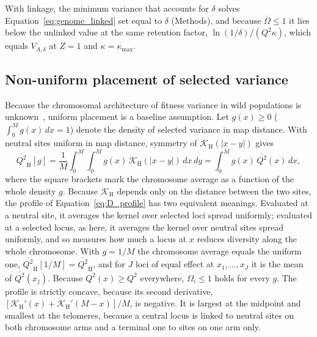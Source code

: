 \documentclass{article}
\begin{document}
With linkage, the minimum variance that accounts for $\delta$ solves Equation~\eqref{eq:genome_linked} set equal to $\delta$ (Methods), and because $\overline{\Omega} \le 1$ it lies below the unlinked value at the same retention factor, $\ln(1/\delta)/(Q^2\kappa)$, which equals $V_{A,\delta}$ at $Z = 1$ and $\kappa = \kappa_\text{max}$.

\subsection{Non-uniform placement of selected variance}\label{app:D_spatial}
Because the chromosomal architecture of fitness variance in wild populations is unknown~\cite{barton2002}, uniform placement is a baseline assumption. Let $g(x) \ge 0$ ($\int_0^M g(x)\,dx = 1$) denote the density of selected variance in map distance. With neutral sites uniform in map distance, symmetry of $\mathcal{K}_\text{H}(\vert x-y\vert)$ gives
\begin{equation}
    \overline{Q^2}_\text{H}[g] = \frac{1}{M}\int_0^M\!\!\int_0^M g(x)\, \mathcal{K}_\text{H}(\vert x-y\vert)\,dx\,dy = \int_0^M g(x)\,\overline{Q^2}(x)\,dx, \label{general_g}
\end{equation}
where the square brackets mark the chromosome average as a function of the whole density $g$. Because $\mathcal{K}_\text{H}$ depends only on the distance between the two sites, the profile of Equation~\eqref{eq:D_profile} has two equivalent meanings. Evaluated at a neutral site, it averages the kernel over selected loci spread uniformly; evaluated at a selected locus, as here, it averages the kernel over neutral sites spread uniformly, and so measures how much a locus at $x$ reduces diversity along the whole chromosome. With $g = 1/M$ the chromosome average equals the uniform one, $\overline{Q^2}_\text{H}[1/M] = \overline{Q^2}_\text{H}$, and for $J$ loci of equal effect at $x_1, \ldots, x_J$ it is the mean of $\overline{Q^2}(x_j)$. Because $\overline{Q^2}(x) \ge Q^2$ everywhere, $\Omega_i \le 1$ holds for every $g$. The profile is strictly concave, because its second derivative, $[\mathcal{K}_\text{H}'(x) + \mathcal{K}_\text{H}'(M-x)]/M$, is negative. It is largest at the midpoint and smallest at the telomeres, because a central locus is linked to neutral sites on both chromosome arms and a terminal one to sites on one arm only.
\end{document}
